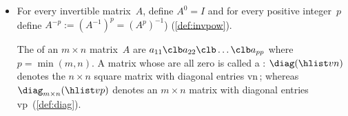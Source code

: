 \begin{itemize}
\itemme If \(A\) is an {invertible} matrix, then its  is unique, and denoted by~\(A^{-1}\) (\cref{thm:uninv}).

\itemhi For every \(2\times2\) matrix \(A=\begin{bmat} a&b\\c&d \end{bmat}\), the matrix~\(A\) is {invertible} if and only if the  \(ad-bc\neq0\) (\cref{thm:2x2det}), in which case
\begin{equation*}
A^{-1}=\frac1{ad-bc}\begin{bmatrix} d&-b\\-c&a \end{bmatrix}.
\end{equation*}

\itemme If a matrix~\(A\) is {invertible}, then  \(A\xv=\bv\) has the {unique solution} \(\xv=A^{-1}\bv\) for every~\(\bv\) (\cref{thm:invuniqsol}).

\itemme For all invertible matrices~\(A\) and~\(B\), the inverse has the properties (\cref{thm:invprop}):
\begin{itemize}
\item  matrix \(A^{-1}\) is invertible and \((A^{-1})^{-1}=A\)\,;
\item if scalar \(c\neq0\)\,, then matrix~\(cA\) is invertible and \((cA)^{-1}=\frac1cA^{-1}\);
\item matrix \(AB\) is invertible and \((AB)^{-1}=B^{-1}A^{-1}\) (remember the reversed order);
\item matrix \(\tr A\) is invertible and \((\tr A)^{-1}=\tr{(A^{-1})}\);
\item matrices \(A^p\) are invertible for all \(p=1,2,3,\ldots\) and \((A^p)^{-1}=(A^{-1})^p\).
\end{itemize}

\item For every {invertible} matrix~\(A\), define \(A^0=I\) and for every positive integer~\(p\) define \(A^{-p}:=(A^{-1})^p=(A^p)^{-1}\)) (\cref{def:invpow}).

\itemhi The  of an \(m\times n\) matrix~\(A\) are  \(a_{11}\clb a_{22}\clb \ldots\clb a_{pp}\) where \(p=\min(m,n)\).
A matrix whose  are all zero is called a : \(\diag(\hlist vn)\) denotes the \(n\times n\) square matrix with diagonal entries \hlist vn\,; whereas \(\diag_{m\times n}(\hlist vp)\) denotes an \(m\times n\) matrix with diagonal entries \hlist vp\ (\cref{def:diag}).


\end{itemize}
